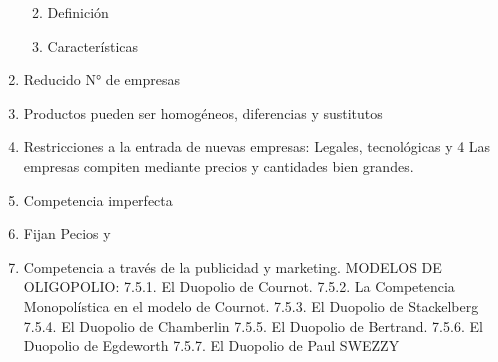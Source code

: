 \documentclass[
  letterpaper,
  DIV=11,
  numbers=noendperiod]{scrartcl}
\providecommand{\tightlist}{%
  \setlength{\itemsep}{0pt}\setlength{\parskip}{0pt}}\usepackage{longtable,booktabs,array}
\begin{document}
\begin{enumerate}
  \begin{enumerate}
  \def\labelenumii{\Alph{enumii})}
  \tightlist
  \item
    Definición
  \item
    Características
  \end{enumerate}
\item
  Reducido N° de empresas
\item
  Productos pueden ser homogéneos, diferencias y sustitutos
\item
  Restricciones a la entrada de nuevas empresas: Legales, tecnológicas y
  4 Las empresas compiten mediante precios y cantidades bien grandes.
\item
  Competencia imperfecta
\item
  Fijan Pecios y
\item
  Competencia a través de la publicidad y marketing. MODELOS DE
  OLIGOPOLIO: 7.5.1. El Duopolio de Cournot. 7.5.2. La Competencia
  Monopolística en el modelo de Cournot. 7.5.3. El Duopolio de
  Stackelberg 7.5.4. El Duopolio de Chamberlin 7.5.5. El Duopolio de
  Bertrand. 7.5.6. El Duopolio de Egdeworth 7.5.7. El Duopolio de Paul
  SWEZZY
\end{enumerate}


\printbibliography
\end{document}
